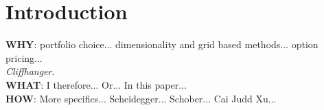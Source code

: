 \documentclass[11pt]{article}
\begin{document}
\fi

\section{Introduction}\label{sec:Introduction}
\textbf{WHY}: portfolio choice... dimensionality and grid based methods... option pricing... \\
\textit{Cliffhanger}.\\
\textbf{WHAT}: I therefore... Or... In this paper...\\
\textbf{HOW}: More specifics... Scheidegger... Schober... Cai Judd Xu...\\

\ifdefined\COMPILINGMAIN
\else
\printbibliography
\end{document}
